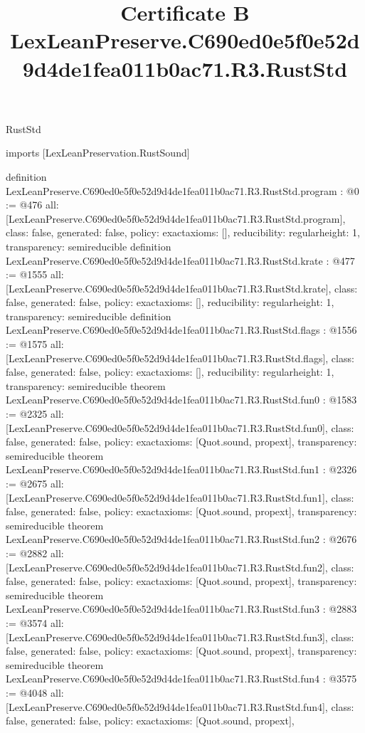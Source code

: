 \begin{lexlean}{RustStd}
\title{Certificate B LexLeanPreserve.C690ed0e5f0e52d9d4de1fea011b0ac71.R3.RustStd}
\begin{coremodule}
imports [LexLeanPreservation.RustSound]

definition LexLeanPreserve.C690ed0e5f0e52d9d4de1fea011b0ac71.R3.RustStd.program : @0 := @476 {
  all: [LexLeanPreserve.C690ed0e5f0e52d9d4de1fea011b0ac71.R3.RustStd.program],
  class: false,
  generated: false,
  policy: exact{axioms: []},
  reducibility: regular{height: 1},
  transparency: semireducible
}
definition LexLeanPreserve.C690ed0e5f0e52d9d4de1fea011b0ac71.R3.RustStd.krate : @477 := @1555 {
  all: [LexLeanPreserve.C690ed0e5f0e52d9d4de1fea011b0ac71.R3.RustStd.krate],
  class: false,
  generated: false,
  policy: exact{axioms: []},
  reducibility: regular{height: 1},
  transparency: semireducible
}
definition LexLeanPreserve.C690ed0e5f0e52d9d4de1fea011b0ac71.R3.RustStd.flags : @1556 := @1575 {
  all: [LexLeanPreserve.C690ed0e5f0e52d9d4de1fea011b0ac71.R3.RustStd.flags],
  class: false,
  generated: false,
  policy: exact{axioms: []},
  reducibility: regular{height: 1},
  transparency: semireducible
}
theorem LexLeanPreserve.C690ed0e5f0e52d9d4de1fea011b0ac71.R3.RustStd.fun0 : @1583 := @2325 {
  all: [LexLeanPreserve.C690ed0e5f0e52d9d4de1fea011b0ac71.R3.RustStd.fun0],
  class: false,
  generated: false,
  policy: exact{axioms: [Quot.sound, propext]},
  transparency: semireducible
}
theorem LexLeanPreserve.C690ed0e5f0e52d9d4de1fea011b0ac71.R3.RustStd.fun1 : @2326 := @2675 {
  all: [LexLeanPreserve.C690ed0e5f0e52d9d4de1fea011b0ac71.R3.RustStd.fun1],
  class: false,
  generated: false,
  policy: exact{axioms: [Quot.sound, propext]},
  transparency: semireducible
}
theorem LexLeanPreserve.C690ed0e5f0e52d9d4de1fea011b0ac71.R3.RustStd.fun2 : @2676 := @2882 {
  all: [LexLeanPreserve.C690ed0e5f0e52d9d4de1fea011b0ac71.R3.RustStd.fun2],
  class: false,
  generated: false,
  policy: exact{axioms: [Quot.sound, propext]},
  transparency: semireducible
}
theorem LexLeanPreserve.C690ed0e5f0e52d9d4de1fea011b0ac71.R3.RustStd.fun3 : @2883 := @3574 {
  all: [LexLeanPreserve.C690ed0e5f0e52d9d4de1fea011b0ac71.R3.RustStd.fun3],
  class: false,
  generated: false,
  policy: exact{axioms: [Quot.sound, propext]},
  transparency: semireducible
}
theorem LexLeanPreserve.C690ed0e5f0e52d9d4de1fea011b0ac71.R3.RustStd.fun4 : @3575 := @4048 {
  all: [LexLeanPreserve.C690ed0e5f0e52d9d4de1fea011b0ac71.R3.RustStd.fun4],
  class: false,
  generated: false,
  policy: exact{axioms: [Quot.sound, propext]},
}
\end{coremodule}
\end{lexlean}
